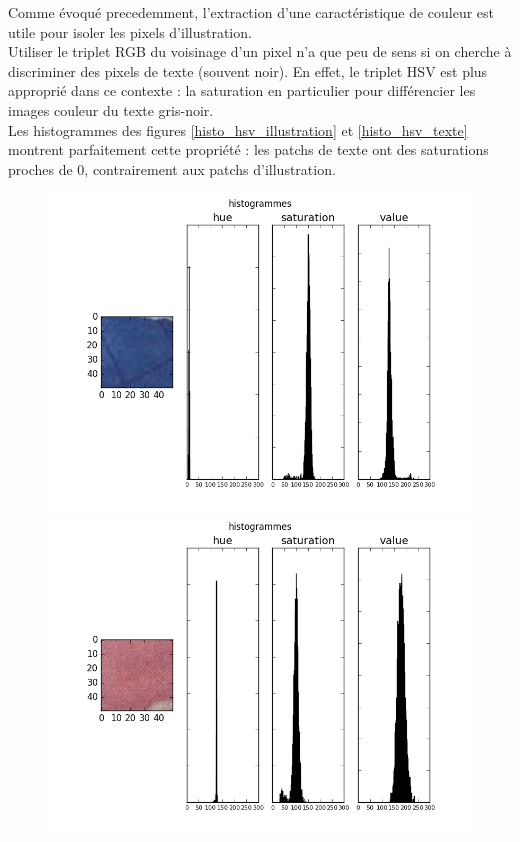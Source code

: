 \documentclass{book}
\begin{document}
Comme évoqué precedemment, l'extraction d'une caractéristique de couleur est utile pour isoler les pixels d'illustration.\\
Utiliser le triplet RGB du voisinage d'un pixel n'a que peu de sens si on cherche à discriminer des pixels de texte (souvent noir).
En effet, le triplet HSV est plus approprié dans ce contexte : la saturation en particulier pour différencier les images couleur du texte gris-noir.\\
Les histogrammes des figures \ref{histo_hsv_illustration} et \ref{histo_hsv_texte} montrent parfaitement cette propriété : les patchs de texte ont des saturations
proches de 0, contrairement aux patchs d'illustration.\\

\begin{figure}[H]
\begin{center}
\includegraphics[scale=0.4]{images/histo_hsv_image.jpg}
\includegraphics[scale=0.4]{images/histo_hsv_image2.jpg}

\end{center}
\end{figure}
\end{document}
